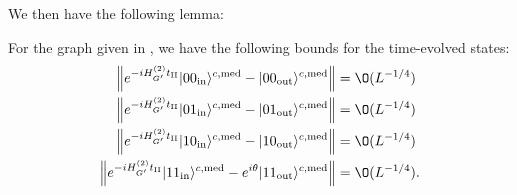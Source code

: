 \documentclass[../thesis-main/thesis-main]{subfiles}
\begin{document}
We then have the following lemma:
\begin{lemma}
For the graph given in , we have the following bounds for the time-evolved states:
\begin{align}
\left\Vert e^{-iH_{G'}^{(2)}t_{\mathrm{II}}}|00_{\text{in}}\rangle^{c,\med}-|00_{\text{out}}\rangle^{c,\med}\right\Vert  & = \O(L^{-{1}/{4}})\label{eq:bound00}\\
\left\Vert e^{-iH_{G'}^{(2)}t_{\mathrm{II}}}|01_{\text{in}}\rangle^{c,\med}-|01_{\text{out}}\rangle^{c,\med}\right\Vert  & = \O(L^{-{1}/{4}})\label{eq:bound01}\\
\left\Vert e^{-iH_{G'}^{(2)}t_{\mathrm{II}}}|10_{\text{in}}\rangle^{c,\med}-|10_{\text{out}}\rangle^{c,\med}\right\Vert  & = \O(L^{-{1}/{4}})\label{eq:bound10}\\
\left\Vert e^{-iH_{G'}^{(2)}t_{\mathrm{II}}}|11_{\text{in}}\rangle^{c,\med} - e^{i\theta}|11_{\text{out}}\rangle^{c,\med}\right\Vert  & = \O(L^{-{1}/{4}}).\label{eq:bound11}
\end{align}
\end{lemma}
\end{document}
